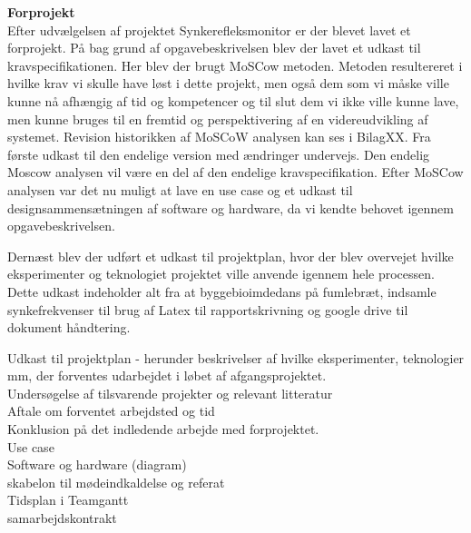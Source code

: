  \textbf{Forprojekt}\\
 
 Efter udvælgelsen af projektet Synkerefleksmonitor er der blevet lavet et forprojekt. På bag grund af opgavebeskrivelsen blev der lavet et udkast til kravspecifikationen. Her blev der brugt MoSCow metoden. Metoden resultereret i hvilke krav vi skulle have løst i dette projekt, men også dem som vi måske ville kunne nå afhængig af tid og kompetencer og til slut dem vi ikke ville kunne lave, men kunne bruges til en fremtid og perspektivering af en videreudvikling af systemet. Revision historikken af MoSCoW analysen kan ses i BilagXX. Fra første udkast til den endelige version med ændringer undervejs. Den endelig Moscow analysen vil være en del af den endelige kravspecifikation. Efter MoSCow analysen var det nu muligt at lave en use case og et udkast til designsammensætningen af software og hardware, da vi kendte behovet igennem opgavebeskrivelsen. 
 
Dernæst blev der udført et udkast til projektplan, hvor der blev overvejet hvilke eksperimenter og teknologiet projektet ville anvende igennem hele processen. Dette udkast indeholder alt fra at byggebioimdedans på fumlebræt, indsamle synkefrekvenser til brug af Latex til rapportskrivning og google drive til dokument håndtering. 
 
 
 
 
 Udkast til projektplan - herunder beskrivelser af hvilke eksperimenter, teknologier mm, der forventes udarbejdet i løbet af afgangsprojektet.\\
 
 Undersøgelse af tilsvarende projekter og relevant litteratur\\
 
 Aftale om forventet arbejdsted og tid\\
 
 Konklusion på det indledende arbejde med forprojektet.\\
 
 Use case\\
 
 Software og hardware (diagram)\\
 
 skabelon til mødeindkaldelse og referat\\
 
 Tidsplan i Teamgantt\\
 
 samarbejdskontrakt\\
 
